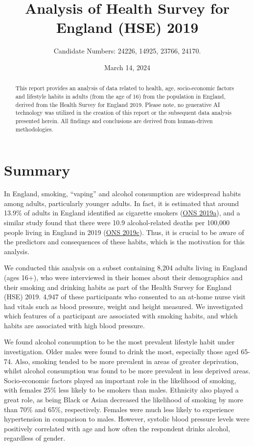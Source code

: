 \documentclass[
  11pt,
  twocolumn]{article}
\title{Analysis of Health Survey for England (HSE) 2019}
\author{Candidate Numbers: 24226, 14925, 23766, 24170.}
\date{March 14, 2024}
\begin{document}
\maketitle
\begin{abstract}
This report provides an analysis of data related to health, age,
socio-economic factors and lifestyle habits in adults (from the age of
16) from the population in England, derived from the Health Survey for
England 2019. Please note, no generative AI technology was utilized in
the creation of this report or the subsequent data analysis presented
herein. All findings and conclusions are derived from human-driven
methodologies.
\end{abstract}


\clearpage

\hypertarget{summary}{%
\section{Summary}\label{summary}}

In England, smoking, ``vaping'' and alcohol consumption are widespread
habits among adults, particularly younger adults. In fact, it is
estimated that around 13.9\% of adults in England identified as
cigarette smokers (\protect\hyperlink{ref-1ONS}{ONS 2019a}), and a
similar study found that there were 10.9 alcohol-related deaths per
100,000 people living in England in 2019
(\protect\hyperlink{ref-2ONS}{ONS 2019c}). Thus, it is crucial to be
aware of the predictors and consequences of these habits, which is the
motivation for this analysis.

We conducted this analysis on a subset containing 8,204 adults living in
England (ages 16+), who were interviewed in their homes about their
demographics and their smoking and drinking habits as part of the Health
Survey for England (HSE) 2019. 4,947 of these participants who consented
to an at-home nurse visit had vitals such as blood pressure, weight and
height measured. We investigated which features of a participant are
associated with smoking habits, and which habits are associated with
high blood pressure.

We found alcohol consumption to be the most prevalent lifestyle habit
under investigation. Older males were found to drink the most,
especially those aged 65-74. Also, smoking tended to be more prevalent
in areas of greater deprivation, whilst alcohol consumption was found to
be more prevalent in less deprived areas. Socio-economic factors played
an important role in the likelihood of smoking, with females 25\% less
likely to be smokers than males. Ethnicity also played a great role, as
being Black or Asian decreased the likelihood of smoking by more than
70\% and 65\%, respectively. Females were much less likely to experience
hypertension in comparison to males. However, systolic blood pressure
levels were positively correlated with age and how often the respondent
drinks alcohol, regardless of gender.
\end{document}
